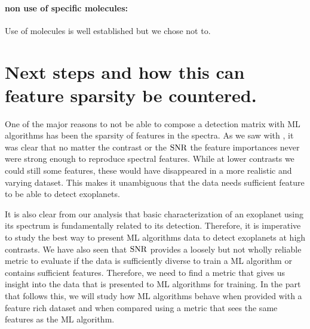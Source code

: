 \paragraph{non use of specific molecules:\\}
Use of molecules is well established but we chose not to.

\section{Next steps and how this can feature sparsity be countered.}
One of the major reasons to not be able to compose a detection matrix with ML algorithms has been the sparsity of features in the spectra.
As we saw with , it was clear that no matter the contrast or the $\rm{SNR}$ the feature importances never were strong enough to reproduce spectral features.
While at lower contrasts we could still some features, these would have disappeared in a more realistic and varying dataset.
This makes it unambiguous that the data needs sufficient feature to be able to detect exoplanets.

It is also clear from our analysis that basic characterization of an exoplanet using its spectrum is fundamentally related to its detection. 
Therefore, it is imperative to study the best way to present ML algorithms data to detect exoplanets at high contrasts.
We have also seen that $\rm{SNR}$ provides a loosely but not wholly reliable metric to evaluate if the data is sufficiently diverse to train a ML algorithm or contains sufficient features.
Therefore, we need to find a metric that gives us insight into the data that is presented to ML algorithms for training.
In the part that follows this, we will study how ML algorithms behave when provided with a feature rich dataset and when compared using a metric that sees the same features as the ML algorithm.

